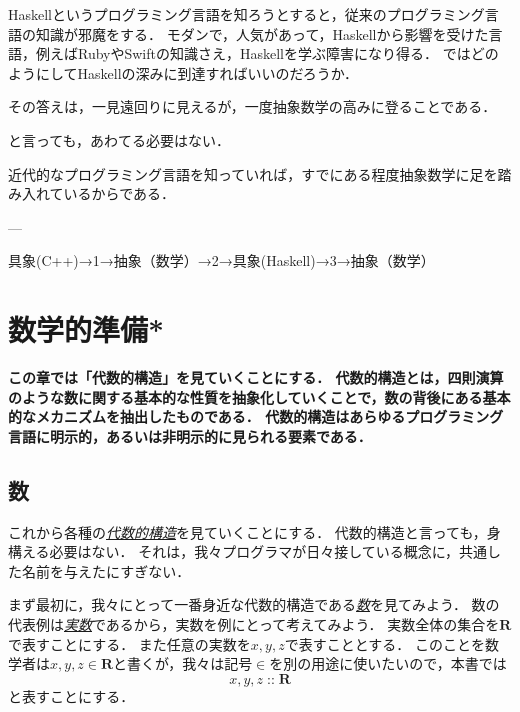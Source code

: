 \documentclass[twocolumn]{jsbook}
\newcommand{\keyword}[1]{\underline{\emph{#1}}}
\newenvironment{leader}{\begingroup\bf}{\endgroup}
\DeclareMathOperator{\mathIn}{::}
\newcommand{\mathSet}[1]{\mathbf{#1}}
\begin{document}
Haskellというプログラミング言語を知ろうとすると，従来のプログラミング言語の知識が邪魔をする．
モダンで，人気があって，Haskellから影響を受けた言語，例えばRubyやSwiftの知識さえ，Haskellを学ぶ障害になり得る．
ではどのようにしてHaskellの深みに到達すればいいのだろうか．

その答えは，一見遠回りに見えるが，一度抽象数学の高みに登ることである．

と言っても，あわてる必要はない．

近代的なプログラミング言語を知っていれば，すでにある程度抽象数学に足を踏み入れているからである．

---

具象(C++)→1→抽象（数学）→2→具象(Haskell)→3→抽象（数学）

\chapter{数学的準備*}

\begin{leader}
この章では「代数的構造」を見ていくことにする．
代数的構造とは，四則演算のような数に関する基本的な性質を抽象化していくことで，数の背後にある基本的なメカニズムを抽出したものである．
代数的構造はあらゆるプログラミング言語に明示的，あるいは非明示的に見られる要素である．
\end{leader}

\section{数}

これから各種の\keyword{代数的構造}を見ていくことにする．
代数的構造と言っても，身構える必要はない．
それは，我々プログラマが日々接している概念に，共通した名前を与えたにすぎない．

まず最初に，我々にとって一番身近な代数的構造である\keyword{数}を見てみよう．
数の代表例は\keyword{実数}であるから，実数を例にとって考えてみよう．
実数全体の集合を$\mathSet{R}$で表すことにする．
また任意の実数を$x,y,z$で表すこととする．
このことを数学者は$x,y,z\in\mathSet{R}$と書くが，我々は記号$\in$を別の用途に使いたいので，本書では$$x,y,z\mathIn\mathSet{R}$$と表すことにする．
\end{document}
